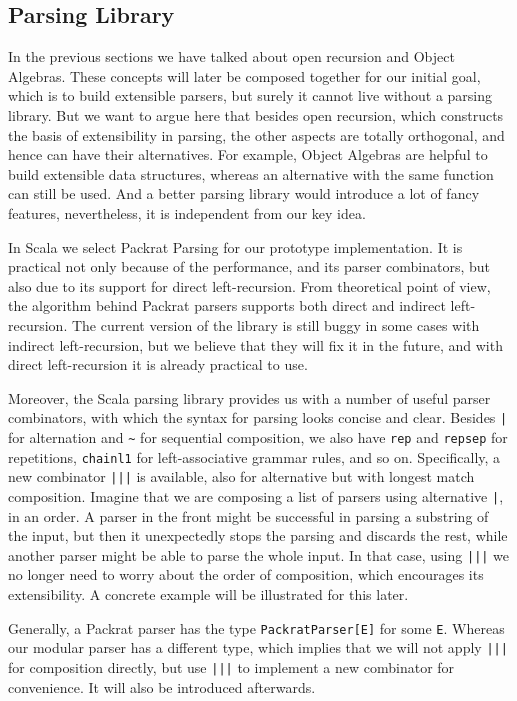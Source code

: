 \subsection{Parsing Library}\label{subsec:parsinglibrary}

In the previous sections we have talked about open recursion and Object Algebras. These concepts will later be composed together for our
initial goal, which is to build extensible parsers, but surely it cannot live without a parsing library. But we want to argue here that besides
open recursion, which constructs the basis of extensibility in parsing, the other aspects are totally orthogonal, and hence can have their alternatives.
For example, Object Algebras are helpful to build extensible data structures, whereas an alternative with the same function can still be used. And a better
parsing library would introduce a lot of fancy features, nevertheless, it is independent from our key idea.

In Scala we select Packrat Parsing for our prototype implementation. It is practical not only because of the performance, and its parser combinators, but also due to its support for direct left-recursion. From theoretical point of view, the algorithm behind Packrat parsers supports both direct and indirect left-recursion. The current version of the library is still buggy in some cases with indirect left-recursion, but we believe that they will fix it in the future, and with direct left-recursion it is already practical to use.

Moreover, the Scala parsing library provides us with a number of useful parser combinators, with which the syntax for parsing looks concise and clear. Besides \lstinline{|} for alternation and \lstinline{~} for sequential composition, we also have \lstinline{rep} and \lstinline{repsep} for repetitions, \lstinline{chainl1} for left-associative grammar rules, and so on. Specifically, a new combinator \lstinline{|||} is available, also for alternative but with longest match composition. Imagine that we are composing a list of parsers using alternative \lstinline{|}, in an order. A parser in the front might be successful in parsing a substring of the input, but then it unexpectedly stops the parsing and discards the rest, while another parser might be able to parse the whole input. In that case, using \lstinline{|||} we no longer need to worry about the order of composition, which encourages its extensibility. A concrete example will be illustrated for this later.

Generally, a Packrat parser has the type \lstinline{PackratParser[E]} for some \lstinline{E}. Whereas our modular parser has a different type, which implies that we will not apply \lstinline{|||} for composition directly, but use \lstinline{|||} to implement a new combinator for convenience. It will also be introduced afterwards. 